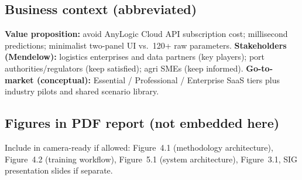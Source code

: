 \documentclass[12pt,twocolumn,a4paper]{article}
\theoremstyle{plain}
\theoremstyle{definition}
\theoremstyle{remark}
\begin{document}
\subsection{Business context (abbreviated)}

\textbf{Value proposition:} avoid AnyLogic Cloud API subscription cost; millisecond predictions; minimalist two-panel UI vs.\ 120+ raw parameters.
\textbf{Stakeholders (Mendelow):} logistics enterprises and data partners (key players); port authorities/regulators (keep satisfied); agri SMEs (keep informed).
\textbf{Go-to-market (conceptual):} Essential / Professional / Enterprise SaaS tiers plus industry pilots and shared scenario library.

\subsection{Figures in PDF report (not embedded here)}

Include in camera-ready if allowed: Figure~4.1 (methodology architecture), Figure~4.2 (training workflow), Figure~5.1 (system architecture), Figure~3.1, SIG presentation slides if separate.
\end{document}
